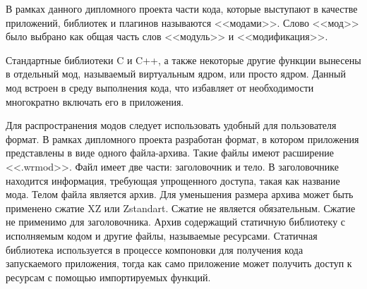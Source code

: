 В рамках данного дипломного проекта части кода, которые выступают в качестве приложений, библиотек и плагинов называются <<модами>>. 
Слово <<мод>> было выбрано как общая часть слов <<модуль>> и <<модификация>>.

Стандартные библиотеки C и C++, а также некоторые другие функции вынесены в отдельный мод, называемый виртуальным ядром, или просто ядром.
Данный мод встроен в среду выполнения кода, что избавляет от необходимости многократно включать его в приложения.

Для распространения модов следует использовать удобный для пользователя формат.
В рамках дипломного проекта разработан формат, в котором приложения представлены в виде одного файла-архива.
Такие файлы имеют расширение <<.wrmod>>.
Файл имеет две части: заголовочник и тело.
В заголовочнике находится информация, требующая упрощенного доступа, такая как название мода.
Телом файла является архив.
Для уменьшения размера архива может быть применено сжатие XZ или Zstandart.
Сжатие не является обязательным.
Сжатие не применимо для заголовочника.
Архив содержащий статичную библиотеку с исполняемым кодом и другие файлы, называемые ресурсами.
Статичная библиотека используется в процессе компоновки для получения кода запускаемого приложения, тогда как само приложение может получить доступ к ресурсам с помощью импортируемых функций.
